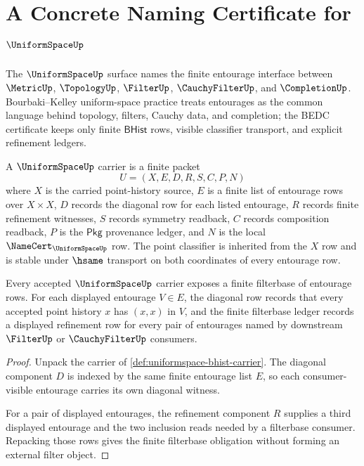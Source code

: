 \chapter{A Concrete Naming Certificate for $\UniformSpaceUp$}
\label{ch:concrete-instances-uniformspace-namecert}

The $\UniformSpaceUp$ surface names the finite entourage interface between
$\MetricUp$, $\TopologyUp$, $\FilterUp$, $\CauchyFilterUp$, and
$\CompletionUp$. Bourbaki--Kelley uniform-space practice treats entourages as
the common language behind topology, filters, Cauchy data, and completion; the
BEDC certificate keeps only finite $\mathsf{BHist}$ rows, visible classifier
transport, and explicit refinement ledgers.

\begin{definition}
\label{def:uniformspace-bhist-carrier}
A $\UniformSpaceUp$ carrier is a finite packet
$$
U=(X,E,D,R,S,C,P,N)
$$
where $X$ is the carried point-history source, $E$ is a finite list of
entourage rows over $X\times X$, $D$ records the diagonal row for each listed
entourage, $R$ records finite refinement witnesses, $S$ records symmetry
readback, $C$ records composition readback, $P$ is the $\mathsf{Pkg}$
provenance ledger, and $N$ is the local $\NameCert_{\UniformSpaceUp}$ row.
The point classifier is inherited from the $X$ row and is stable under
$\hsame$ transport on both coordinates of every entourage row.
\end{definition}

\begin{theorem}
\label{thm:uniformspace-filterbase-diagonal-obligation}
Every accepted $\UniformSpaceUp$ carrier exposes a finite filterbase of
entourage rows. For each displayed entourage $V\in E$, the diagonal row
records that every accepted point history $x$ has $(x,x)$ in $V$, and the
finite filterbase ledger records a displayed refinement row for every pair of
entourages named by downstream $\FilterUp$ or $\CauchyFilterUp$ consumers.
\end{theorem}
\begin{proof}
Unpack the carrier of \autoref{def:uniformspace-bhist-carrier}. The diagonal
component $D$ is indexed by the same finite entourage list $E$, so each
consumer-visible entourage carries its own diagonal witness.

For a pair of displayed entourages, the refinement component $R$ supplies a
third displayed entourage and the two inclusion reads needed by a filterbase
consumer. Repacking those rows gives the finite filterbase obligation without
forming an external filter object.
\end{proof}

